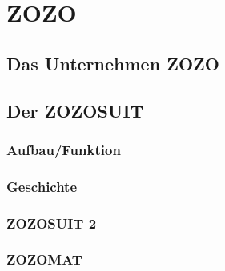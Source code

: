 \chapter{ZOZO}
\label{ch:zozosuit}

\section{Das Unternehmen ZOZO}
\label{sec:zozo}

\section{Der ZOZOSUIT}
\label{sec:zozosuit}

\subsection{Aufbau/Funktion}
\label{subsec:zozosuit-aufbau}

\subsection{Geschichte}
\label{subsec:zozosuit-geschichte}

\subsection{ZOZOSUIT 2}
\label{subsec:zozosuit2}

\subsection{ZOZOMAT}
\label{subsec:zozomat}